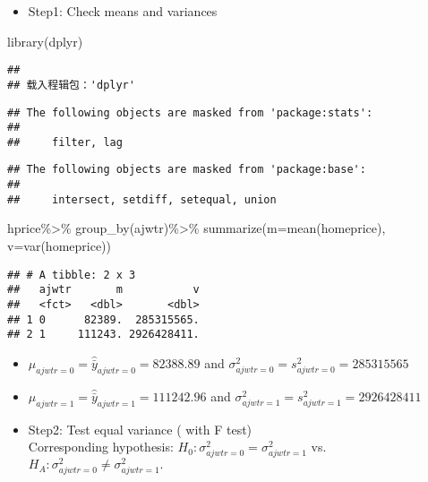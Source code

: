 \documentclass[
  12pt,
]{article}
\newenvironment{Shaded}{\begin{snugshade}}{\end{snugshade}}
\newcommand{\AttributeTok}[1]{\textcolor[rgb]{0.77,0.63,0.00}{#1}}
\newcommand{\FunctionTok}[1]{\textcolor[rgb]{0.00,0.00,0.00}{#1}}
\newcommand{\NormalTok}[1]{#1}
\newcommand{\SpecialCharTok}[1]{\textcolor[rgb]{0.00,0.00,0.00}{#1}}
\providecommand{\tightlist}{%
  \setlength{\itemsep}{0pt}\setlength{\parskip}{0pt}}
\begin{document}
\begin{itemize}
\tightlist
\item
  Step1: Check means and variances\\
\end{itemize}

\begin{Shaded}
\begin{Highlighting}[]
\FunctionTok{library}\NormalTok{(dplyr)}
\end{Highlighting}
\end{Shaded}

\begin{verbatim}
## 
## 载入程辑包：'dplyr'
\end{verbatim}

\begin{verbatim}
## The following objects are masked from 'package:stats':
## 
##     filter, lag
\end{verbatim}

\begin{verbatim}
## The following objects are masked from 'package:base':
## 
##     intersect, setdiff, setequal, union
\end{verbatim}

\begin{Shaded}
\begin{Highlighting}[]
\NormalTok{hprice}\SpecialCharTok{\%\textgreater{}\%}
  \FunctionTok{group\_by}\NormalTok{(ajwtr)}\SpecialCharTok{\%\textgreater{}\%}
  \FunctionTok{summarize}\NormalTok{(}\AttributeTok{m=}\FunctionTok{mean}\NormalTok{(homeprice),}
            \AttributeTok{v=}\FunctionTok{var}\NormalTok{(homeprice))}
\end{Highlighting}
\end{Shaded}

\begin{verbatim}
## # A tibble: 2 x 3
##   ajwtr       m           v
##   <fct>   <dbl>       <dbl>
## 1 0      82389.  285315565.
## 2 1     111243. 2926428411.
\end{verbatim}

\begin{itemize}
\item
  \(\mu_{ajwtr=0}=\hat{\bar{y}}_{ajwtr=0}=82388.89\) and
  \(\sigma^2_{ajwtr=0}=s^2_{ajwtr=0}=285315565\)
\item
  \(\mu_{ajwtr=1}=\hat{\bar{y}}_{ajwtr=1}=111242.96\) and
  \(\sigma^2_{ajwtr=1}=s^2_{ajwtr=1}=2926428411\)
\item
  Step2: Test equal variance ( with F test)\\
  Corresponding hypothesis:
  \(H_0:\sigma^2_{ajwtr=0}=\sigma^2_{ajwtr=1}\)
  vs.~\(H_A:\sigma^2_{ajwtr=0}\neq\sigma^2_{ajwtr=1}.\)
\end{itemize}
\end{document}
